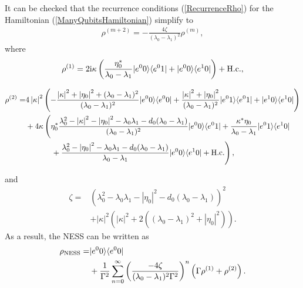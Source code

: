 \documentclass[aps,pra,letterpaper,twocolumn,showpacs,superscriptaddress,floatfix,longbibliography]{revtex4-1}
\newcommand{\hc}{\mathop{\mathrm{H.c.}}\limits}
\begin{document}
It can be checked that the recurrence conditions (\ref{RecurrenceRho})
for the Hamiltonian (\ref{ManyQubitsHamiltonian}) simplify to
\begin{align}
  \rho^{\left(m+2\right)} =
  -\frac{4\zeta}{(\lambda_0-\lambda_1)^{2}}\rho^{\left(m\right)},
\end{align}
where
\begin{align}
  \rho^{\left(1\right)} = 2\mathrm{i}\kappa
  \left(\frac{\eta_{0}^{*}}{\lambda_0-\lambda_1}
    \ket{e^{0}0}\bra{e^{0}1}+\ket{e^{0}0}\bra{e^{1}0}\right) +\hc,
\end{align}
\begin{widetext}
  \begin{align}
    \rho^{\left(2\right)}=&
    4\left|\kappa\right|^{2}\left(-\frac{\left|\kappa\right|^{2}+
        \left|\eta_{0}\right|^{2}+(\lambda_0-\lambda_1)^{2}}
      {(\lambda_0-\lambda_1)^{2}} \ket{e^{0}0}\bra{e^{0}0} +
      \frac{\left|\kappa\right|^{2}+\left|\eta_{0}\right|^{2}}
      {(\lambda_0-\lambda_1)^{2}} \ket{e^{0}1}\bra{e^{0}1}
      +\ket{e^{1}0}\bra{e^{1}0} \right) \nonumber\\
    &+
    4\kappa\left(\eta_{0}^{*}\frac{\lambda_0^{2}-\left|\kappa\right|^{2}
        -\left|\eta_{0}\right|^{2}-\lambda_0\lambda_1-d_0
        (\lambda_0-\lambda_1)}{(\lambda_0-\lambda_1)^{2}}
      \ket{e^{0}0}\bra{e^{0}1}
      +\frac{\kappa^{*}\eta_{0}}{\lambda_0-\lambda_1}\ket{e^{0}1}
      \bra{e^{1}0}
    \right.\nonumber\\
    &\left.\phantom{++ 4\kappa}+
      \frac{\lambda_0^{2}-\left|\eta_{0}\right|^{2}-\lambda_0\lambda_1
        -d_0(\lambda_0-\lambda_1)}{\lambda_0-\lambda_1}
      \ket{e^{0}0}\bra{e^{1}0}+\hc\right),
  \end{align}
\end{widetext}
and
\begin{align}
  \zeta =&
  \left(\lambda_0^{2}-\lambda_0\lambda_1-\left|\eta_{0}\right|^{2}
    -d_0(\lambda_0-\lambda_1) \right)^{2} \nonumber\\
  &+\left|\kappa\right|^{2}\left( |\kappa|^{2}+2\left((
      \lambda_0-\lambda_1)^{2} + |\eta_{0}|^{2}\right)\right).
\end{align}
As a result, the NESS can be written as
\begin{align}
  \rho_\mathrm{NESS} =& \ket{e^{0}0}\bra{e^{0}0} \nonumber\\ &+
  \frac{1}{\Gamma^2} \sum_{n=0}^{\infty}\left(\frac{-4\zeta}
    {(\lambda_0-\lambda_1)^{2}\Gamma^2}\right)^{n}
  \left(\Gamma\rho^{\left(1\right)}+\rho^{\left(2\right)}\right).
  \label{ExactNESSexpansion}%
\end{align}
\end{document}
